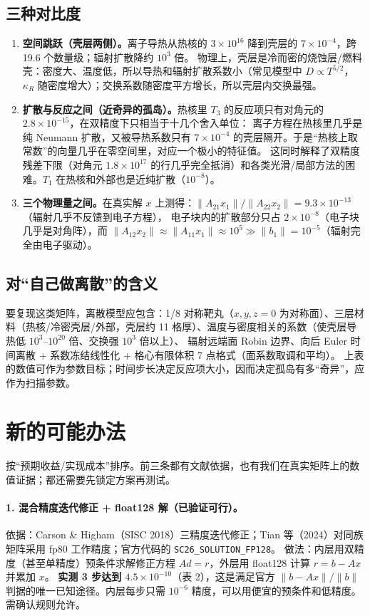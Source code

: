 \documentclass[11pt,a4paper]{ctexart}
\begin{document}
\subsection{三种对比度}
\begin{enumerate}
\item \textbf{空间跳跃（壳层两侧）。}离子导热从热核的 $3\times10^{16}$ 降到壳层的 $7\times10^{-4}$，跨 19.6 个数量级；辐射扩散降约 $10^{3}$ 倍。
物理上，壳层是冷而密的烧蚀层/燃料壳：密度大、温度低，所以导热和辐射扩散系数小（常见模型中 $D\propto T^{5/2}$，$\kappa_R$ 随密度增大）；交换系数随密度平方增长，所以壳层内交换最强。
\item \textbf{扩散与反应之间（近奇异的孤岛）。}热核里 $T_3$ 的反应项只有对角元的 $2.8\times10^{-15}$，在双精度下只相当于十几个舍入单位：
离子方程在热核里几乎是纯 Neumann 扩散，又被导热系数只有 $7\times10^{-4}$ 的壳层隔开。于是“热核上取常数”的向量几乎在零空间里，对应一个极小的特征值。
这同时解释了双精度残差下限（对角元 $1.8\times10^{17}$ 的行几乎完全抵消）和各类光滑/局部方法的困难。$T_1$ 在热核和外部也是近纯扩散（$10^{-8}$）。
\item \textbf{三个物理量之间。}在真实解 $x$ 上测得：$\|A_{21}x_1\|/\|A_{22}x_2\|=9.3\times10^{-13}$（辐射几乎不反馈到电子方程），
电子块内的扩散部分只占 $2\times10^{-8}$（电子块几乎是对角阵），而 $\|A_{12}x_2\|\approx\|A_{11}x_1\|\approx10^{5}\gg\|b_1\|=10^{-5}$（辐射完全由电子驱动）。
\end{enumerate}

\subsection{对“自己做离散”的含义}
要复现这类矩阵，离散模型应包含：1/8 对称靶丸（$x,y,z=0$ 为对称面）、三层材料（热核/冷密壳层/外部，壳层约 11 格厚）、温度与密度相关的系数（使壳层导热低 $10^{3}$--$10^{20}$ 倍、交换强 $10^{3}$ 倍以上）、
辐射远端面 Robin 边界、向后 Euler 时间离散 + 系数冻结线性化 + 格心有限体积 7 点格式（面系数取调和平均）。
上表的数值可作为参数目标；时间步长决定反应项大小，因而决定孤岛有多“奇异”，应作为扫描参数。

\section{新的可能办法}
按“预期收益/实现成本”排序。前三条都有文献依据，也有我们在真实矩阵上的数值证据；都还需要先锁定方案再测试。

\paragraph{1. 混合精度迭代修正 + float128 解（已验证可行）。}
依据：Carson \& Higham（SISC 2018）三精度迭代修正；Tian 等（2024）对同族矩阵采用 fp80 工作精度；官方代码的 \texttt{SC26\_\allowbreak SOLUTION\_\allowbreak FP128}。
做法：内层用双精度（甚至单精度）预条件求解修正方程 $Ad=r$，外层用 float128 计算 $r=b-Ax$ 并累加 $x$。
\textbf{实测 3 步达到 $4.5\times10^{-10}$}（表 2），这是满足官方 $\|b-Ax\|/\|b\|$ 判据的唯一已知途径。内层每步只需 $10^{-6}$ 精度，可以用便宜的预条件和低精度。需确认规则允许。
\end{document}
